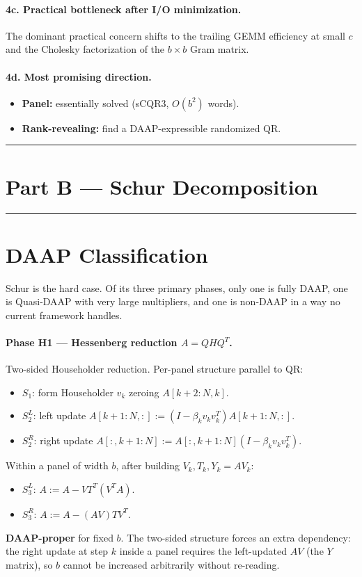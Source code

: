 \documentclass[11pt]{article}
\begin{document}
\paragraph{4c. Practical bottleneck after I/O minimization.}
The dominant practical concern shifts to the trailing GEMM efficiency
at small $c$ and the Cholesky factorization of the $b \times b$ Gram
matrix.

\paragraph{4d. Most promising direction.}
\begin{itemize}[leftmargin=2em]
  \item \textbf{Panel:} essentially solved (sCQR3, $O(b^2)$ words).
  \item \textbf{Rank-revealing:} find a DAAP-expressible randomized QR.
\end{itemize}

\bigskip\hrule
\section*{Part B --- Schur Decomposition}
\hrule

\section{DAAP Classification}
\label{sec:B1}

Schur is the hard case. Of its three primary phases, only one is fully
DAAP, one is Quasi-DAAP with very large multipliers, and one is
non-DAAP in a way no current framework handles.

\paragraph{Phase H1 --- Hessenberg reduction $A = QHQ^T$.}
Two-sided Householder reduction. Per-panel structure parallel to QR:
\begin{itemize}[leftmargin=2em]
  \item $S_1$: form Householder $v_k$ zeroing $A[k+2{:}N, k]$.
  \item $S_2^L$: left update
    $A[k+1{:}N, :] := (I - \beta_k v_k v_k^T) A[k+1{:}N, :]$.
  \item $S_2^R$: right update
    $A[:, k+1{:}N] := A[:, k+1{:}N] (I - \beta_k v_k v_k^T)$.
\end{itemize}
Within a panel of width $b$, after building $V_k, T_k, Y_k = AV_k$:
\begin{itemize}[leftmargin=2em]
  \item $S_3^L$: $A := A - V T^T (V^T A)$.
  \item $S_3^R$: $A := A - (A V) T V^T$.
\end{itemize}
\textbf{DAAP-proper} for fixed $b$. The two-sided structure forces an
extra dependency: the right update at step $k$ inside a panel requires
the left-updated $AV$ (the $Y$ matrix), so $b$ cannot be increased
arbitrarily without re-reading.
\end{document}
